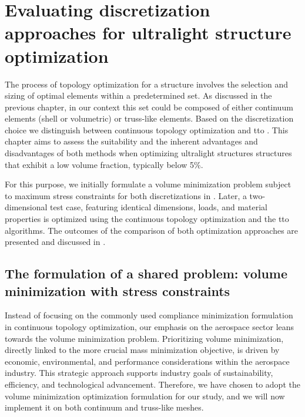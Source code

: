 \setchapterpreamble[u]{\margintoc}
\glsresetall %
\chapter{Evaluating discretization approaches for ultralight structure optimization}
The process of topology optimization for a structure involves the selection and sizing of optimal elements within a predetermined set. As discussed in the previous chapter, in our context this set could be composed of either continuum elements (shell or volumetric) or truss-like elements. Based on the discretization choice we distinguish between continuous topology optimization and \gls{tto} . This chapter aims to assess the suitability and the inherent advantages and disadvantages of both methods when optimizing ultralight structures \ie structures that exhibit a low volume fraction, typically below 5\%. 

For this purpose, we initially formulate a volume minimization problem subject to maximum stress constraints for both discretizations in . Later, a two-dimensional test case, featuring identical dimensions, loads, and material properties is optimized using the continuous topology optimization and the \gls{tto} algorithms. The outcomes of the comparison of both optimization approaches are presented and discussed in . 

\section{The formulation of a shared problem: volume minimization with stress constraints} \label{sec:03_common_prob}
Instead of focusing on the commonly used compliance minimization formulation in continuous topology optimization, our emphasis on the aerospace sector leans towards the volume minimization problem. Prioritizing volume minimization, directly linked to the more crucial mass minimization objective, is driven by economic, environmental, and performance considerations within the aerospace industry. This strategic approach supports industry goals of sustainability, efficiency, and technological advancement. Therefore, we have chosen to adopt the volume minimization optimization formulation for our study, and we will now implement it on both continuum and truss-like meshes.

